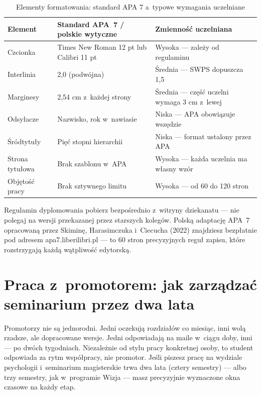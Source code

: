 \documentclass[12pt,a4paper,twoside,openany]{book}
\let\bforigsection\section
\renewcommand{\section}{\needspace{4\baselineskip}\bforigsection}
\begin{document}
\begin{table}[ht]
\centering
\caption{Elementy formatowania: standard APA 7 a~typowe wymagania uczelniane}
\begin{tabularx}{\textwidth}{lXl}
\toprule
\rowcolor{tableheadbg} \textcolor{tableheadfg}{\textbf{Element}} & \textcolor{tableheadfg}{\textbf{Standard APA~7 / polskie wytyczne}} & \textcolor{tableheadfg}{\textbf{Zmienność uczelniana}} \\
\midrule
Czcionka & Times New Roman 12 pt lub Calibri 11 pt & Wysoka --- zależy od regulaminu \\
Interlinia & 2,0 (podwójna) & Średnia --- SWPS dopuszcza 1,5 \\
Marginesy & 2,54 cm z~każdej strony & Średnia --- część uczelni wymaga 3 cm z~lewej \\
Odsyłacze & Nazwisko, rok w~nawiasie & Niska --- APA obowiązuje wszędzie \\
Śródtytuły & Pięć stopni hierarchii & Niska --- format ustalony przez APA \\
Strona tytułowa & Brak szablonu w~APA & Wysoka --- każda uczelnia ma własny wzór \\
Objętość pracy & Brak sztywnego limitu & Wysoka --- od 60 do 120 stron \\
\bottomrule
\end{tabularx}
\end{table}

\begin{keyinsight}
Regulamin dyplomowania pobierz bezpośrednio z~witryny dziekanatu --- nie polegaj na wersji przekazanej przez starszych kolegów. Polską adaptację APA~7 opracowaną przez Skiminę, Harasimczuka i~Ciecucha (2022) znajdziesz bezpłatnie pod adresem apa7.liberilibri.pl --- to 60 stron precyzyjnych reguł zapisu, które rozstrzygają każdą wątpliwość edytorską.
\end{keyinsight}

\section{Praca z~promotorem: jak zarządzać seminarium przez dwa lata}

Promotorzy nie są jednorodni. Jedni oczekują rozdziałów co miesiąc, inni wolą rzadsze, ale dopracowane wersje. Jedni odpowiadają na maile w~ciągu doby, inni --- po dwóch tygodniach. Niezależnie od stylu pracy konkretnej osoby, to student odpowiada za rytm współpracy, nie promotor. Jeśli piszesz pracę na wydziale psychologii i~seminarium magisterskie trwa dwa lata (cztery semestry) --- albo trzy semestry, jak w~programie Wizja --- masz precyzyjnie wyznaczone okna czasowe na każdy etap.
\end{document}
